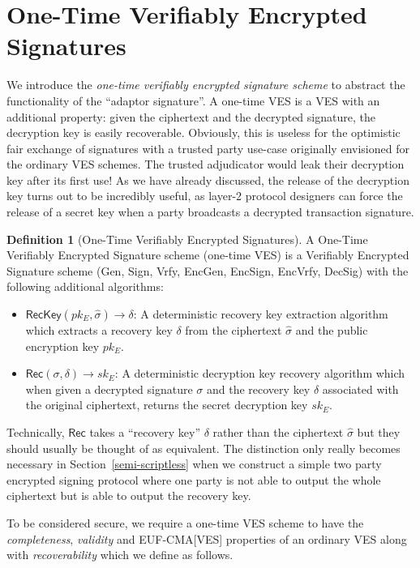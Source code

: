 \documentclass[fullpage]{article}
\theoremstyle{definition}
\newtheorem{definition}{Definition}[section]
\newcommand{\EUFCMAVES}{\textsf{EUF-CMA}[\textsf{VES}]\xspace}
\newcommand{\EncGen}{\textsf{EncGen}}
\newcommand{\EncSign}{\textsf{EncSign}}
\newcommand{\EncVer}{\textsf{EncVrfy}}
\newcommand{\DecSig}{\textsf{DecSig}}
\newcommand{\KeyGen}{\textsf{Gen}}
\newcommand{\Sign}{\textsf{Sign}}
\newcommand{\Verify}{\textsf{Vrfy}}
\newcommand{\Rec}{\textsf{Rec}}
\newcommand{\RecKey}{\textsf{RecKey}}
\newcommand{\rec}{\delta}
\newcommand{\VESALG}{\EncGen, \EncSign, \EncVer, \DecSig}
\newcommand{\SIGNALG}{\KeyGen, \Sign, \Verify}
\newcommand{\skEnc}{sk_E}
\newcommand{\pkEnc}{pk_E}
\newcommand{\hatsigma}{\hat{\sigma}}
\begin{document}
\section{One-Time Verifiably Encrypted Signatures}
\label{otVES}
We introduce the \emph{one-time verifiably encrypted signature scheme} to abstract the functionality of the ``adaptor signature''\cite{poelstra-adaptor}. A one-time VES is a VES with an additional property: given the ciphertext and the decrypted signature, the decryption key is easily recoverable. Obviously, this is useless for the optimistic fair exchange of signatures with a trusted party use-case originally envisioned for the ordinary VES schemes. The trusted adjudicator would leak their decryption key after its first use! As we have already discussed, the release of the decryption key turns out to be incredibly useful, as layer-2 protocol designers can force the release of a secret key when a party broadcasts a decrypted transaction signature.

\begin{definition}[One-Time Verifiably Encrypted Signatures]
A One-Time Verifiably Encrypted Signature scheme (one-time VES) is a Verifiably Encrypted Signature scheme (\SIGNALG, \VESALG) with the following additional algorithms:
\begin{itemize}
    \item $\RecKey(\pkEnc, \hatsigma) \rightarrow \delta$: A deterministic recovery key extraction algorithm which extracts a recovery key $\delta$ from the ciphertext $\hatsigma$ and the public encryption key $\pkEnc$.
    \item $\Rec(\sigma,\rec) \rightarrow \skEnc$: A deterministic decryption key recovery algorithm which when given a decrypted signature $\sigma$ and the recovery key $\rec$ associated with the original ciphertext, returns the secret decryption key $\skEnc$.
\end{itemize}

\end{definition}

Technically, $\Rec$ takes a ``recovery key'' $\delta$ rather than the ciphertext $\hatsigma$ but they should usually be thought of as equivalent. The distinction only really becomes necessary in Section~\ref{semi-scriptless} when we construct a simple two party encrypted signing protocol where one party is not able to output the whole ciphertext but is able to output the recovery key.

To be considered secure, we require a one-time VES scheme to have the \emph{completeness}, \emph{validity} and \EUFCMAVES properties of an ordinary VES along with \emph{recoverability} which we define as follows.
\end{document}
